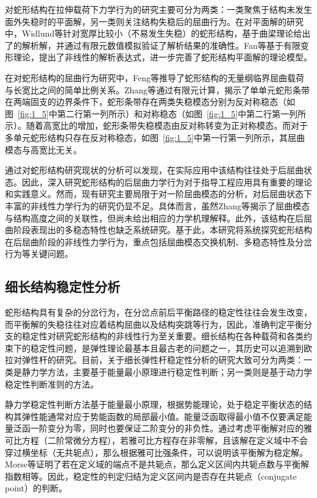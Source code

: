 对蛇形结构在拉伸载荷下力学行为的研究主要可分为两类：一类聚焦于结构未发生面外失稳时的平面解，另一类则关注结构失稳后的屈曲行为。在对平面解的研究中，Widlund等\cite{widlund2014stretchability}针对宽厚比较小（不易发生失稳）的蛇形结构，基于曲梁理论给出了的解析解，并通过有限元数值模拟验证了解析结果的准确性。Fan等\cite{fan2016finite}基于有限变形理论，提出了非线性的解析表达式，进一步完善了蛇形结构平面解的理论模型。

在对蛇形结构的屈曲行为研究中，Feng等\cite{feng2020analytical}推导了蛇形结构的无量纲临界屈曲载荷与长宽比之间的简单比例关系。Zhang等\cite{zhang2013buckling}通过有限元计算，揭示了单单元蛇形条带在两端固支的边界条件下，蛇形条带存在两类失稳模态分别为反对称稳态（如图~\ref{fig:1_5}中第二行第一列所示）和对称稳态（如图~\ref{fig:1_5}中第二行第一列所示）。随着高宽比的增加，蛇形条带失稳模态由反对称转变为正对称模态。而对于多单元蛇形结构只存在反对称稳态，如图~\ref{fig:1_5}中第一行第一列所示，其屈曲模态与高宽比无关。

通过对蛇形结构研究现状的分析可以发现，在实际应用中该结构往往处于后屈曲状态。因此，深入研究蛇形结构的后屈曲力学行为对于指导工程应用具有重要的理论和实践意义。然而，现有研究主要局限于对一阶屈曲模态的分析，对后屈曲状态下丰富的非线性力学行为的研究仍显不足。具体而言，虽然Zhang等\cite{zhang2013buckling}揭示了屈曲模态与结构高度之间的关联性，但尚未给出相应的力学机理解释。此外，该结构在后屈曲阶段表现出的多稳态特性也缺乏系统研究。基于此，本研究将系统探究蛇形结构在后屈曲阶段的非线性力学行为，重点包括屈曲模态交换机制、多稳态特性及分岔行为等关键问题。


\subsection{细长结构稳定性分析}
蛇形结构具有复杂的分岔行为，在分岔点前后平衡路径的稳定性往往会发生改变，而平衡解的失稳往往对应着结构屈曲以及结构突跳等行为，因此，准确判定平衡分支的稳定性对研究蛇形结构的非线性行为至关重要。细长结构在各种载荷和各类约束下的稳定性问题，是弹性理论最基本且最古老的问题之一，其历史可以追溯到欧拉对弹性杆的研究。目前，关于细长弹性杆稳定性分析的研究大致可分为两类：一类是静力学方法，主要基于能量最小原理进行稳定性判断；另一类则是基于动力学稳定性判断准则的方法。

静力学稳定性判断方法基于能量最小原理，根据势能理论，处于稳定平衡状态的结构其弹性能通常对应于势能函数的局部最小值。能量泛函取得最小值不仅要满足能量泛函一阶变分为零，同时也要保证二阶变分的非负性。通过考虑平衡解对应的雅可比方程\cite{gelfand2000calculus}（二阶常微分方程），若雅可比方程存在非零解，且该解在定义域中不会穿过横坐标（无共轭点），那么根据雅可比强条件，可以说明该平衡解为稳定解。Morse等\cite{morse1951introduction}证明了若在定义域的端点不是共轭点，那么定义区间内共轭点数与平衡解指数相等。因此，稳定性的判定归结为定义区间内是否存在共轭点\cite{gelfand2000calculus}（conjugate point）的判断。

